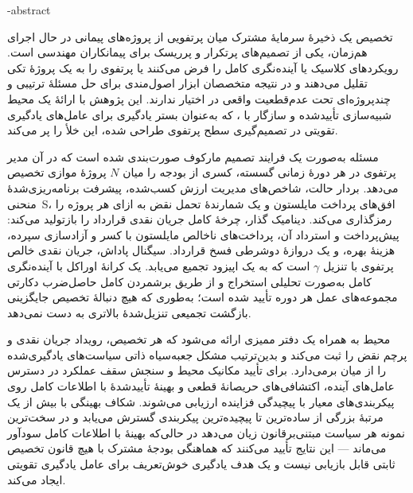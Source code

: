 \fa-abstract{
تخصیص یک ذخیرهٔ سرمایهٔ مشترک میان پرتفویی از پروژه‌های پیمانی در حال اجرای هم‌زمان، یکی از تصمیم‌های پرتکرار و پرریسک برای پیمانکاران مهندسی است. رویکردهای کلاسیک یا آینده‌نگری کامل را فرض می‌کنند یا پرتفوی را به یک پروژهٔ تکی تقلیل می‌دهند و در نتیجه متخصصان ابزار اصول‌مندی برای حل مسئلهٔ ترتیبی و چندپروژه‌ای تحت عدم‌قطعیت واقعی در اختیار ندارند. این پژوهش با ارائهٔ یک محیط شبیه‌سازی تأییدشده و سازگار با ، که به‌عنوان بستر یادگیری برای عامل‌های یادگیری تقویتی در تصمیم‌گیری سطح پرتفوی طراحی شده، این خلأ را پر می‌کند.

مسئله به‌صورت یک فرایند تصمیم مارکوف صورت‌بندی شده است که در آن مدیر پرتفوی در هر دورهٔ زمانی گسسته، کسری از بودجه را میان $N$ پروژهٔ موازی تخصیص می‌دهد. بردار حالت، شاخص‌های مدیریت ارزش کسب‌شده، پیشرفت برنامه‌ریزی‌شدهٔ منحنی~S، افق‌های پرداخت مایلستون و یک شمارندهٔ تحمل نقض به ازای هر پروژه را رمزگذاری می‌کند. دینامیک گذار، چرخهٔ کامل جریان نقدی قرارداد  را بازتولید می‌کند: پیش‌پرداخت و استرداد آن، پرداخت‌های ناخالص مایلستون با کسر و آزادسازی سپرده، هزینهٔ بهره، و یک دروازهٔ دوشرطی فسخ قرارداد. سیگنال پاداش، جریان نقدی خالص پرتفوی با تنزیل $\gamma$ است که به  یک اپیزود تجمیع می‌یابد. یک کرانهٔ اوراکل با آینده‌نگری کامل به‌صورت تحلیلی استخراج و از طریق برشمردن کامل حاصل‌ضرب دکارتی مجموعه‌های عمل هر دوره تأیید شده است؛ به‌طوری که هیچ دنبالهٔ تخصیص جایگزینی بازگشت تجمیعی تنزیل‌شدهٔ بالاتری به دست نمی‌دهد.

محیط به همراه یک دفتر ممیزی  ارائه می‌شود که هر تخصیص، رویداد جریان نقدی و پرچم نقض را ثبت می‌کند و بدین‌ترتیب مشکل جعبه‌سیاه ذاتی سیاست‌های یادگیری‌شده را از میان برمی‌دارد. برای تأیید مکانیک محیط و سنجش سقف عملکرد در دسترس عامل‌های آینده، اکتشافی‌های حریصانهٔ قطعی و بهینهٔ تأییدشدهٔ با اطلاعات کامل روی پیکربندی‌های معیار با پیچیدگی فزاینده ارزیابی می‌شوند. شکاف بهینگی با بیش از یک مرتبهٔ بزرگی از ساده‌ترین تا پیچیده‌ترین پیکربندی گسترش می‌یابد و در سخت‌ترین نمونه هر سیاست مبتنی‌بر‌قانون زیان می‌دهد در حالی‌که بهینهٔ با اطلاعات کامل سودآور می‌ماند --- این نتایج تأیید می‌کنند که هماهنگی بودجهٔ مشترک با هیچ قانون تخصیص ثابتی قابل بازیابی نیست و یک هدف یادگیری خوش‌تعریف برای عامل یادگیری تقویتی ایجاد می‌کند.
}

